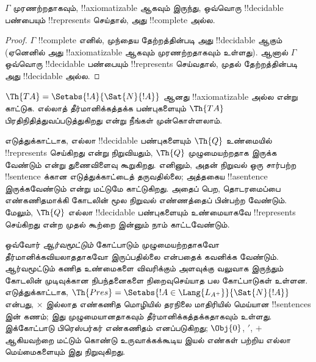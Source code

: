 \documentclass[../../../include/open-logic-section]{subfiles}
\begin{document}
\begin{cor}
$\Gamma$ முரணற்றதாகவும், !!{axiomatizable} ஆகவும் இருந்து, ஒவ்வொரு
!!{decidable} பண்பையும் !!{represents} செய்தால், அது !!{complete} அல்ல.
\end{cor}

\begin{proof}
$\Gamma$ !!{complete} எனில், முந்தைய தேற்றத்தின்படி அது !!{decidable}
ஆகும் (ஏனெனில் அது !!{axiomatizable} ஆகவும் முரணற்றதாகவும் உள்ளது).
ஆனால் $\Gamma$ ஒவ்வொரு !!{decidable} பண்பையும் !!{represents} செய்வதால்,
முதல் தேற்றத்தின்படி அது !!{decidable} அல்ல.
\end{proof}

\begin{prob}
$\Th{TA} = \Setabs{!A}{\Sat{N}{!A}}$ ஆனது !!{axiomatizable} அல்ல என்று
காட்டுக. எல்லாத் தீர்மானிக்கத்தக்க பண்புகளையும் $\Th{TA}$ பிரதிநிதித்துவப்படுத்துகிறது
என்று நீங்கள் முன்கொள்ளலாம்.
\end{prob}

எடுத்துக்காட்டாக, எல்லா !!{decidable} பண்புகளையும் $\Th{Q}$ உண்மையில்
!!{represents} செய்கிறது என்று நிறுவியதும், $\Th{Q}$ முழுமையற்றதாக இருக்க
வேண்டும் என்று துணைவிளைவு கூறுகிறது. எனினும், அதன் நிறுவல் ஒரு சார்பற்ற
!!{sentence} க்கான எடுத்துக்காட்டைத் தருவதில்லை; அத்தகைய !!a{sentence}
இருக்கவேண்டும் என்று மட்டுமே காட்டுகிறது. அதைப் பெற, தொடரமைப்பை
எண்கணிதமாக்கி கோடலின் மூல நிறுவல் எண்ணத்தைப் பின்பற்ற வேண்டும். மேலும்,
$\Th{Q}$ எல்லா !!{decidable} பண்புகளையும் உண்மையாகவே !!{represents}
செய்கிறது என்ற முதல் கூற்றை இன்னும் நாம் காட்டவேண்டும்.

ஒவ்வோர் \emph{ஆர்வமூட்டும்} கோட்பாடும் முழுமையற்றதாகவோ
தீர்மானிக்கவியலாததாகவோ இருப்பதில்லை என்பதைக் கவனிக்க வேண்டும். ஆர்வமூட்டும்
கணித உண்மைகளை விவரிக்கும் அளவுக்கு வலுவாக இருந்தும் கோடலின் முடிவுக்கான
நிபந்தனைகளை நிறைவுசெய்யாத பல கோட்பாடுகள் உள்ளன. எடுத்துக்காட்டாக,
$\Th{Pres} = \Setabs{!A \in \Lang{L_{A^+}}}{\Sat{N}{!A}}$ என்பது,
$\times$ இல்லாத எண்கணித மொழியில் தரநிலை மாதிரியில் மெய்யான
!!{sentence}s இன் கணம்; இது முழுமையானதாகவும் தீர்மானிக்கத்தக்கதாகவும்
உள்ளது. இக்கோட்பாடு பிரெஸ்பர்கர் எண்கணிதம் எனப்படுகிறது; $\Obj{0}$,
$\prime$, $+$ ஆகியவற்றை மட்டும் கொண்டு உருவாக்கக்கூடிய இயல் எண்கள் பற்றிய
எல்லா மெய்மைகளையும் இது நிறுவுகிறது.
\end{document}

